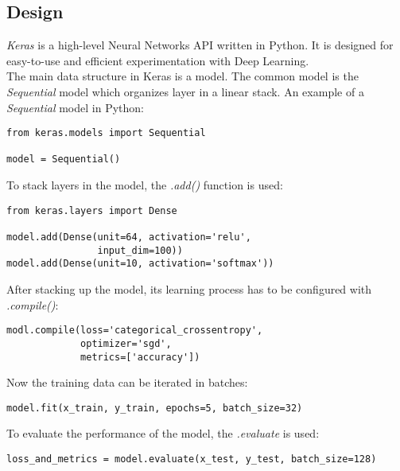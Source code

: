 \subsection{Design}


\textit{Keras} is a high-level Neural Networks API written in Python. It is
designed for easy-to-use and efficient experimentation with Deep
Learning.~\cite{chollet2015keras}\\


The main data structure in Keras is a model. The common model is the
\textit{Sequential} model which organizes layer in a linear stack. An example of
a \textit{Sequential} model in Python:

\begin{lstlisting}
from keras.models import Sequential

model = Sequential()
\end{lstlisting}

\noindent To stack layers in the model, the \textit{.add()} function is used:

\begin{lstlisting}
from keras.layers import Dense

model.add(Dense(unit=64, activation='relu', 
                input_dim=100))
model.add(Dense(unit=10, activation='softmax'))
\end{lstlisting}

\noindent After stacking up the model, its learning process has to be configured
with \textit{.compile()}:

\begin{lstlisting}
modl.compile(loss='categorical_crossentropy', 
             optimizer='sgd',
             metrics=['accuracy'])
\end{lstlisting}

\noindent Now the training data can be iterated in batches:

\begin{lstlisting}
model.fit(x_train, y_train, epochs=5, batch_size=32)
\end{lstlisting}

\noindent To evaluate the performance of the model, the \textit{.evaluate} is
used:

\begin{lstlisting}
loss_and_metrics = model.evaluate(x_test, y_test, batch_size=128)
\end{lstlisting}
